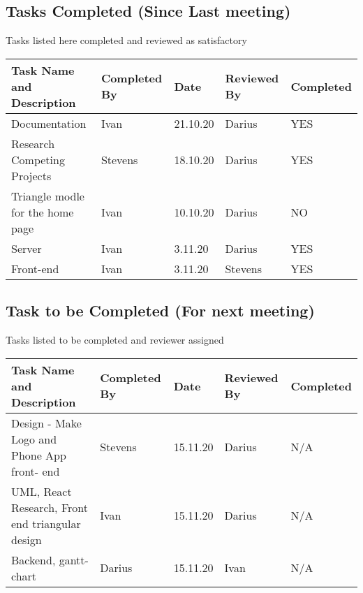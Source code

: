 \documentclass{article}
\begin{document}
\subsection{Tasks Completed (Since Last meeting)}
Tasks listed here completed and reviewed as satisfactory
\begin{center}
    \begin{tabular}{|p{9cm}|l|l|l|l|}
    \hline
    Task Name and Description & Completed By & Date & Reviewed By & Completed \\ \hline
    Documentation & Ivan & 21.10.20 & Darius & YES \\ \hline
    Research Competing Projects & Stevens & 18.10.20 & Darius & YES \\ \hline
    Triangle modle for the home page & Ivan & 10.10.20 & Darius & NO \\ \hline
    Server & Ivan & 3.11.20 & Darius & YES \\ \hline
    Front-end & Ivan & 3.11.20 & Stevens & YES \\ \hline
    \end{tabular}
    \end{center}

\subsection{Task to be Completed (For next meeting) }
Tasks listed to be completed and reviewer assigned
\begin{center}
    \begin{tabular}{|p{9cm}|l|l|l|l|}
    \hline
    Task Name and Description & Completed By & Date & Reviewed By & Completed \\ \hline
    Design - Make Logo and Phone App front- end & Stevens & 15.11.20 & Darius & N/A \\ \hline
    UML, React Research, Front end triangular design & Ivan & 15.11.20  & Darius & N/A \\ \hline
    Backend, gantt-chart & Darius & 15.11.20 & Ivan & N/A \\ \hline
    \end{tabular}
    \end{center}
\end{document}
